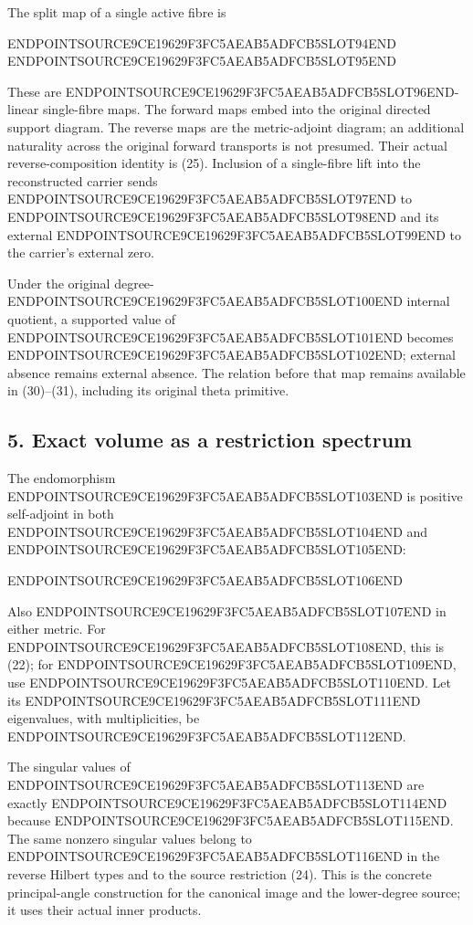 The split map of a single active fibre is

ENDPOINTSOURCE9CE19629F3FC5AEAB5ADFCB5SLOT94END ENDPOINTSOURCE9CE19629F3FC5AEAB5ADFCB5SLOT95END

These are ENDPOINTSOURCE9CE19629F3FC5AEAB5ADFCB5SLOT96END-linear single-fibre maps. The forward maps embed into the original directed support diagram. The reverse maps are the metric-adjoint diagram; an additional naturality across the original forward transports is not presumed. Their actual reverse-composition identity is (25). Inclusion of a single-fibre lift into the reconstructed carrier sends ENDPOINTSOURCE9CE19629F3FC5AEAB5ADFCB5SLOT97END to ENDPOINTSOURCE9CE19629F3FC5AEAB5ADFCB5SLOT98END and its external ENDPOINTSOURCE9CE19629F3FC5AEAB5ADFCB5SLOT99END to the carrier's external zero.

Under the original degree-ENDPOINTSOURCE9CE19629F3FC5AEAB5ADFCB5SLOT100END internal quotient, a supported value of ENDPOINTSOURCE9CE19629F3FC5AEAB5ADFCB5SLOT101END becomes ENDPOINTSOURCE9CE19629F3FC5AEAB5ADFCB5SLOT102END; external absence remains external absence. The relation before that map remains available in (30)--(31), including its original theta primitive.

\subsection{5. Exact volume as a restriction spectrum}\label{endpoint-restriction_original--exact-volume-as-a-restriction-spectrum}

The endomorphism ENDPOINTSOURCE9CE19629F3FC5AEAB5ADFCB5SLOT103END is positive self-adjoint in both ENDPOINTSOURCE9CE19629F3FC5AEAB5ADFCB5SLOT104END and ENDPOINTSOURCE9CE19629F3FC5AEAB5ADFCB5SLOT105END:

ENDPOINTSOURCE9CE19629F3FC5AEAB5ADFCB5SLOT106END

Also ENDPOINTSOURCE9CE19629F3FC5AEAB5ADFCB5SLOT107END in either metric. For ENDPOINTSOURCE9CE19629F3FC5AEAB5ADFCB5SLOT108END, this is (22); for ENDPOINTSOURCE9CE19629F3FC5AEAB5ADFCB5SLOT109END, use ENDPOINTSOURCE9CE19629F3FC5AEAB5ADFCB5SLOT110END. Let its ENDPOINTSOURCE9CE19629F3FC5AEAB5ADFCB5SLOT111END eigenvalues, with multiplicities, be ENDPOINTSOURCE9CE19629F3FC5AEAB5ADFCB5SLOT112END.

The singular values of ENDPOINTSOURCE9CE19629F3FC5AEAB5ADFCB5SLOT113END are exactly ENDPOINTSOURCE9CE19629F3FC5AEAB5ADFCB5SLOT114END because ENDPOINTSOURCE9CE19629F3FC5AEAB5ADFCB5SLOT115END. The same nonzero singular values belong to ENDPOINTSOURCE9CE19629F3FC5AEAB5ADFCB5SLOT116END in the reverse Hilbert types and to the source restriction (24). This is the concrete principal-angle construction for the canonical image and the lower-degree source; it uses their actual inner products.

